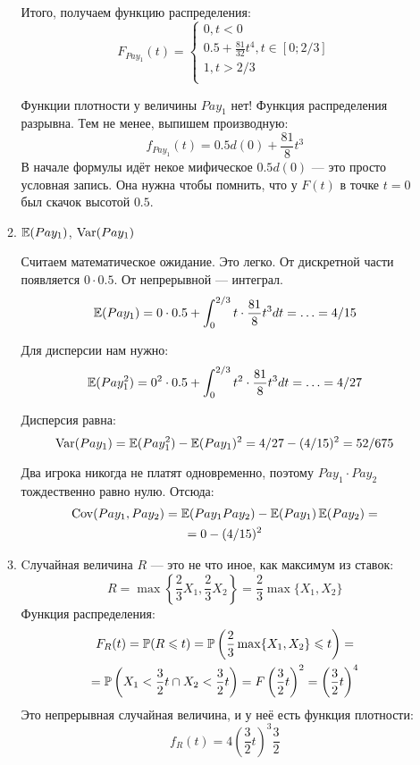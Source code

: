 \begin{enumerate}
\begin{enumerate}
Итого, получаем функцию распределения:
\begin{equation}
F_{Pay_{1}}(t)=
\begin{cases}
0, t<0 \\
0.5+\frac{81}{32}t^{4}, t\in [0;2/3] \\
1, t>2/3 \\
\end{cases}
\end{equation}

Функции плотности у величины $ Pay_{1} $ нет! Функция распределения разрывна. Тем не менее, выпишем производную:
\begin{equation}
f_{Pay_{1}}(t)=0.5d(0)+\frac{81}{8}t^{3}
\end{equation}
В начале формулы идёт некое мифическое $ 0.5d(0) $ — это просто условная запись. Она нужна чтобы помнить, что у  $ F(t) $ в точке $ t=0 $ был скачок высотой $ 0.5 $.


\item $ \E(Pay_{1}) $, $\Var(Pay_{1}) $

Считаем математическое ожидание. Это легко. От дискретной части появляется $ 0\cdot 0.5 $. От непрерывной — интеграл.
\begin{equation}
\E(Pay_{1})=0\cdot 0.5+\int_{0}^{2/3}t\cdot \frac{81}{8}t^{3} dt=\ldots=4/15
\end{equation}

Для дисперсии нам нужно:
\begin{equation}
\E(Pay_{1}^{2})=0^{2}\cdot 0.5+\int_{0}^{2/3}t^{2}\cdot \frac{81}{8}t^{3} dt=\ldots=4/27
\end{equation}

Дисперсия равна:
\begin{equation}
\Var(Pay_{1})=\E(Pay_{1}^{2})-\E(Pay_{1})^{2}=4/27-(4/15)^{2}=52/675
\end{equation}


Два игрока никогда не платят одновременно, поэтому $ Pay_{1}\cdot Pay_{2} $ тождественно равно нулю. Отсюда:
\begin{multline}
\Cov(Pay_{1},Pay_{2})=\E(Pay_{1}Pay_{2})-\E(Pay_{1})\E(Pay_{2})=\\
=0-(4/15)^{2}
\end{multline}
\item Cлучайная величина $ R$ — это не что иное, как максимум из ставок:
\begin{equation}
R=\max\left\{ \frac{2}{3}X_{1},\frac{2}{3}X_{2} \right\}=\frac{2}{3}\max\{X_{1},X_{2}\}
\end{equation}
Функция распределения:
\begin{multline}
F_{R}(t)=\P(R\leq t)=\P\left(\frac{2}{3}\max\{X_{1},X_{2}\}\leq t\right)=\\
=\P\left(X_{1}<\frac{3}{2}t \cap X_{2}<\frac{3}{2}t\right)=F\left(\frac{3}{2}t\right)^{2}=\left(\frac{3}{2}t\right)^{4}
\end{multline}
Это непрерывная случайная величина, и у неё есть функция плотности:
\begin{equation}
f_{R}(t)=4\left(\frac{3}{2}t\right)^{3}\frac{3}{2}
\end{equation}


\end{enumerate}
\end{enumerate}

